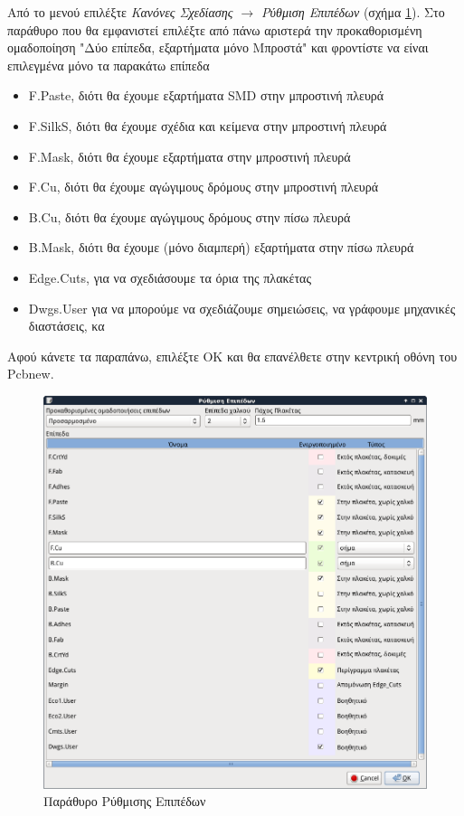 \documentclass[a4paper]{article}
\begin{document}
Από το μενού επιλέξτε \textit{Κανόνες Σχεδίασης $\rightarrow$ Ρύθμιση Επιπέδων} (σχήμα \ref{fig:pcb-dial-layers}). Στο παράθυρο που θα εμφανιστεί επιλέξτε από πάνω αριστερά την προκαθορισμένη ομαδοποίηση "Δύο επίπεδα, εξαρτήματα μόνο Μπροστά" και φροντίστε να είναι επιλεγμένα μόνο τα παρακάτω επίπεδα
\begin{itemize}
    \item F.Paste, διότι θα έχουμε εξαρτήματα SMD στην μπροστινή πλευρά
    \item F.SilkS, διότι θα έχουμε σχέδια και κείμενα στην μπροστινή πλευρά
    \item F.Mask, διότι θα έχουμε εξαρτήματα στην μπροστινή πλευρά
    \item F.Cu, διότι θα έχουμε αγώγιμους δρόμους στην μπροστινή πλευρά
    \item B.Cu, διότι θα έχουμε αγώγιμους δρόμους στην πίσω πλευρά
    \item B.Mask, διότι θα έχουμε (μόνο διαμπερή) εξαρτήματα στην πίσω πλευρά
    \item Edge.Cuts, για να σχεδιάσουμε τα όρια της πλακέτας
    \item Dwgs.User για να μπορούμε να σχεδιάζουμε σημειώσεις, να γράφουμε μηχανικές διαστάσεις, κα
\end{itemize}

Αφού κάνετε τα παραπάνω, επιλέξτε ΟΚ και θα επανέλθετε στην κεντρική οθόνη του Pcbnew.

\begin{figure}
  \begin{center}
    \includegraphics[width=.9\textwidth]{img/pcb-dial-layers.png}
    \caption{Παράθυρο Ρύθμισης Επιπέδων}
    \label{fig:pcb-dial-layers}
  \end{center}
\end{figure}
\end{document}
